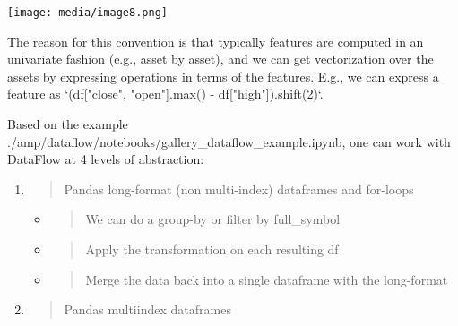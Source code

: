 \documentclass[11pt, reqno]{amsart}
\begin{document}
\texttt{[image: media/image8.png]}

The reason for this convention is that typically features are computed
in an univariate fashion (e.g., asset by asset), and we can get
vectorization over the assets by expressing operations in terms of the
features. E.g., we can express a feature as `(df{[}"close",
"open"{]}.max() - df{[}"high"{]}).shift(2)`.

Based on the example
./amp/dataflow/notebooks/gallery\_dataflow\_example.ipynb, one can work
with DataFlow at 4 levels of abstraction:

\begin{enumerate}
\def\labelenumi{\arabic{enumi})}
\item
  \begin{quote}
  Pandas long-format (non multi-index) dataframes and for-loops
  \end{quote}

  \begin{itemize}
  \item
    \begin{quote}
    We can do a group-by or filter by full\_symbol
    \end{quote}
  \item
    \begin{quote}
    Apply the transformation on each resulting df
    \end{quote}
  \item
    \begin{quote}
    Merge the data back into a single dataframe with the long-format
    \end{quote}
  \end{itemize}
\item
  \begin{quote}
  Pandas multiindex dataframes
  \end{quote}


\end{enumerate}
\end{document}
